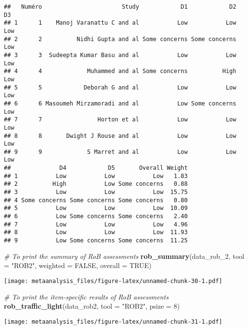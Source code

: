 \documentclass[
]{article}
\newenvironment{Shaded}{\begin{snugshade}}{\end{snugshade}}
\newcommand{\AttributeTok}[1]{\textcolor[rgb]{0.13,0.29,0.53}{#1}}
\newcommand{\CommentTok}[1]{\textcolor[rgb]{0.56,0.35,0.01}{\textit{#1}}}
\newcommand{\ConstantTok}[1]{\textcolor[rgb]{0.56,0.35,0.01}{#1}}
\newcommand{\DecValTok}[1]{\textcolor[rgb]{0.00,0.00,0.81}{#1}}
\newcommand{\FunctionTok}[1]{\textcolor[rgb]{0.13,0.29,0.53}{\textbf{#1}}}
\newcommand{\NormalTok}[1]{#1}
\newcommand{\StringTok}[1]{\textcolor[rgb]{0.31,0.60,0.02}{#1}}
\begin{document}
\begin{verbatim}
##   Numéro                       Study            D1            D2  D3
## 1      1    Manoj Varanattu C and al           Low           Low Low
## 2      2          Nidhi Gupta and al Some concerns Some concerns Low
## 3      3  Sudeepta Kumar Basu and al           Low           Low Low
## 4      4             Muhammed and al Some concerns          High Low
## 5      5            Deborah G and al           Low           Low Low
## 6      6 Masoumeh Mirzamoradi and al           Low Some concerns Low
## 7      7                Horton et al           Low           Low Low
## 8      8       Dwight J Rouse and al           Low           Low Low
## 9      9             S Marret and al           Low           Low Low
##              D4            D5       Overall Weight
## 1           Low           Low           Low   1.83
## 2          High           Low Some concerns   0.88
## 3           Low           Low           Low  15.75
## 4 Some concerns Some concerns Some concerns   0.80
## 5           Low           Low           Low  10.09
## 6           Low Some concerns Some concerns   2.40
## 7           Low           Low           Low   4.96
## 8           Low           Low           Low  11.93
## 9           Low Some concerns Some concerns  11.25
\end{verbatim}

\begin{Shaded}
\begin{Highlighting}[]
\CommentTok{\# To print the summary of RoB assessments}
\FunctionTok{rob\_summary}\NormalTok{(data\_rob\_2, }\AttributeTok{tool =} \StringTok{"ROB2"}\NormalTok{, }\AttributeTok{weighted =} \ConstantTok{FALSE}\NormalTok{, }\AttributeTok{overall =} \ConstantTok{TRUE}\NormalTok{)}
\end{Highlighting}
\end{Shaded}

\texttt{[image: metaanalysis\_files/figure-latex/unnamed-chunk-30-1.pdf]}

\begin{Shaded}
\begin{Highlighting}[]
\CommentTok{\# To print the item{-}specific results of RoB assessments}
\FunctionTok{rob\_traffic\_light}\NormalTok{(data\_rob2, }\AttributeTok{tool =} \StringTok{"ROB2"}\NormalTok{, }\AttributeTok{psize =} \DecValTok{8}\NormalTok{)}
\end{Highlighting}
\end{Shaded}

\texttt{[image: metaanalysis\_files/figure-latex/unnamed-chunk-31-1.pdf]}
\end{document}
